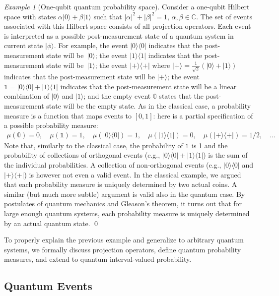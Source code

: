 \documentclass{article}
\theoremstyle{remark}
\newtheorem{example}{Example}
\newcommand{\ket}[1]{|#1\rangle}
\newcommand{\proj}[1]{|#1 \rangle\langle #1 |}
\newcommand{\ps}{\texttt{+}}
\def\C{{\mathbb{C}}}
\begin{document}
\begin{example}[One-qubit quantum probability space] 
  Consider a one-qubit Hilbert space with states
  $\alpha \ket{0} + \beta \ket{1}$ such that
  $|\alpha|^2 + |\beta|^2 = 1$, $\alpha ,\beta \in \C$. The set of events
  associated with this Hilbert space consists of all projection operators. Each event is
  interpreted as a possible post-measurement state of a quantum system
  in current state $\ket{\phi}$. For example, the event $\proj{0}$
  indicates that the post-measurement state will be~$\ket{0}$; the
  event $\proj{1}$ indicates that the post-measurement state will
  be~$\ket{1}$; the event $\proj{\ps}$ where
  $\ket{\ps} = \frac{1}{\sqrt{2}}(\ket{0}+\ket{1})$ indicates that the
  post-measurement state will be $\ket{\ps}$; the event
  $\mathbb{1} = \proj{0}+\proj{1}$ indicates that the post-measurement
  state will be a linear combination of $\ket{0}$ and $\ket{1}$; and
  the empty event $\mathbb{0}$ states that the post-measurement state
  will be the empty state. As in the classical case, a probability
  measure is a function that maps events to $[0,1]$: here is a partial
  specification of a possible probability measure:
\[\begin{array}{rcl}
\mu\left(\mathbb{0}\right) = 0, \quad
\mu\left(\mathbb{1}\right) =  1, \quad
\mu\left(\proj{0}\right) = 1, \quad
\mu\left(\proj{1}\right) = 0, \quad
\mu\left(\proj{\ps}\right) = 1/2, \quad \ldots
\end{array}\]
Note that, similarly to the classical case, the probability of
$\mathbb{1}$ is 1 and the probability of collections of orthogonal
events (e.g., $\proj{0}+\proj{1}$) is the sum of the individual
probabilities. A collection of non-orthogonal events
(e.g., $\proj{0}$ and $\proj{\ps}$) is however not even a valid event.
In the classical example, we argued that each probability measure is
uniquely determined by two actual coins. A similar (but much more
subtle) argument is valid also in the quantum case. By postulates of
quantum mechanics and Gleason's theorem, it turns out that for large
enough quantum systems, each probability measure is uniquely
determined by an actual quantum state.
\qed\end{example}

To properly explain the previous example and generalize to arbitrary
quantum systems, we formally discuss projection operators, 
define quantum probability measures, and extend to quantum interval-valued
probability.

\subsection{Quantum Events}
\end{document}
